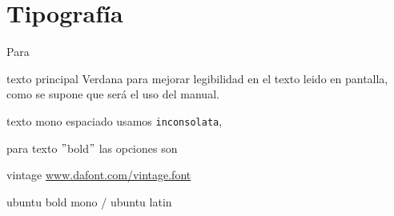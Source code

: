 \section*{Tipograf\'ia}


Para 


texto principal Verdana para mejorar legibilidad en el texto leido en pantalla, como se supone que ser\'a el uso del manual. 

texto mono espaciado usamos \texttt{inconsolata}, 

para texto $"$bold$"$ las opciones son 

vintage \url{www.dafont.com/vintage.font}

ubuntu bold mono / ubuntu latin

